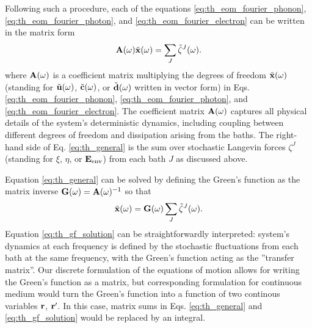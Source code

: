 Following such a procedure, each of the equations \eqref{eq:th_eom_fourier_phonon}, \eqref{eq:th_eom_fourier_photon}, and \eqref{eq:th_eom_fourier_electron} can be written in the matrix form
\begin{equation}
 \mathbf{A}(\omega) \tilde{\mathbf{x}}(\omega) = \sum_J \tilde \zeta^J(\omega). \label{eq:th_general}
\end{equation}
where $\mathbf{A}(\omega)$ is a coefficient matrix multiplying the degrees of freedom $\tilde{\mathbf{x}}(\omega)$ (standing for $\tilde{\mathbf{u}}(\omega)$, $\tilde{\mathbf{c}}(\omega)$, or $\tilde{\mathbf{d}}(\omega)$ written in vector form) in Eqs. \eqref{eq:th_eom_fourier_phonon}, \eqref{eq:th_eom_fourier_photon}, and \eqref{eq:th_eom_fourier_electron}. The coefficient matrix $\mathbf{A}(\omega)$ captures all physical details of the system's deterministic dynamics, including coupling between different degrees of freedom and dissipation arising from the baths. The right-hand side of Eq. \eqref{eq:th_general} is the sum over stochastic Langevin forces $\zeta^J$ (standing for $\xi$, $\eta$, or $\mathbf{E}_{\textrm{env}}$) from each bath $J$ as discussed above.  %


Equation \eqref{eq:th_general} can be solved by defining the Green's function as the matrix inverse $\mathbf{G}(\omega)=\mathbf{A}(\omega)^{-1}$ so that  
\begin{equation}
 \tilde{\mathbf{x}}(\omega)  =  \mathbf{G}(\omega) \sum_J \tilde \zeta^J(\omega). \label{eq:th_gf_solution}
\end{equation}
Equation \eqref{eq:th_gf_solution} can be straightforwardly interpreted: system's dynamics at each frequency is defined by the stochastic fluctuations from each bath at the same frequency, with the Green's function acting as the ''transfer matrix''. Our discrete formulation of the equations of motion allows for writing the Green's function as a matrix, but corresponding formulation for continuous medium would turn the Green's function into a function of two continous variables $\mathbf{r}$, $\mathbf{r}'$. In this case, matrix sums in Eqs. \eqref{eq:th_general} and \eqref{eq:th_gf_solution} would be replaced by an integral.

